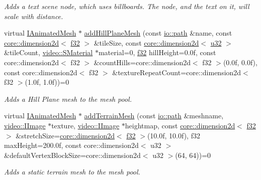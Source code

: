 \begin{DoxyCompactItemize}
\begin{DoxyCompactList}\small\item\em Adds a text scene node, which uses billboards. The node, and the text on it, will scale with distance. \end{DoxyCompactList}\item 
virtual \hyperlink{classirr_1_1scene_1_1IAnimatedMesh}{I\+Animated\+Mesh} $\ast$ \hyperlink{classirr_1_1scene_1_1ISceneManager_a2eb986c6975ebc1aa1f68c878ac8dcda}{add\+Hill\+Plane\+Mesh} (const \hyperlink{namespaceirr_1_1io_a6468281622ce3a1c46b72e19f32dded5}{io\+::path} \&name, const \hyperlink{classirr_1_1core_1_1dimension2d}{core\+::dimension2d}$<$ \hyperlink{namespaceirr_a0277be98d67dc26ff93b1a6a1d086b07}{f32} $>$ \&tile\+Size, const \hyperlink{classirr_1_1core_1_1dimension2d}{core\+::dimension2d}$<$ \hyperlink{namespaceirr_a0416a53257075833e7002efd0a18e804}{u32} $>$ \&tile\+Count, \hyperlink{classirr_1_1video_1_1SMaterial}{video\+::\+S\+Material} $\ast$material=0, \hyperlink{namespaceirr_a0277be98d67dc26ff93b1a6a1d086b07}{f32} hill\+Height=0.\+0f, const core\+::dimension2d$<$ f32 $>$ \&count\+Hills=core\+::dimension2d$<$ f32 $>$(0.\+0f, 0.\+0f), const core\+::dimension2d$<$ f32 $>$ \&texture\+Repeat\+Count=core\+::dimension2d$<$ f32 $>$(1.\+0f, 1.\+0f))=0
\begin{DoxyCompactList}\small\item\em Adds a Hill Plane mesh to the mesh pool. \end{DoxyCompactList}\item 
virtual \hyperlink{classirr_1_1scene_1_1IAnimatedMesh}{I\+Animated\+Mesh} $\ast$ \hyperlink{classirr_1_1scene_1_1ISceneManager_ac56c56d5ec02bfe7cfb35db7afc19b50}{add\+Terrain\+Mesh} (const \hyperlink{namespaceirr_1_1io_a6468281622ce3a1c46b72e19f32dded5}{io\+::path} \&meshname, \hyperlink{classirr_1_1video_1_1IImage}{video\+::\+I\+Image} $\ast$texture, \hyperlink{classirr_1_1video_1_1IImage}{video\+::\+I\+Image} $\ast$heightmap, const \hyperlink{classirr_1_1core_1_1dimension2d}{core\+::dimension2d}$<$ \hyperlink{namespaceirr_a0277be98d67dc26ff93b1a6a1d086b07}{f32} $>$ \&stretch\+Size=\hyperlink{classirr_1_1core_1_1dimension2d}{core\+::dimension2d}$<$ \hyperlink{namespaceirr_a0277be98d67dc26ff93b1a6a1d086b07}{f32} $>$(10.\+0f, 10.\+0f), f32 max\+Height=200.\+0f, const core\+::dimension2d$<$ u32 $>$ \&default\+Vertex\+Block\+Size=core\+::dimension2d$<$ u32 $>$(64, 64))=0
\begin{DoxyCompactList}\small\item\em Adds a static terrain mesh to the mesh pool. \end{DoxyCompactList}\item 

\end{DoxyCompactItemize}
